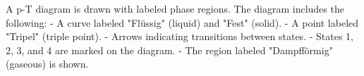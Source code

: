 A p-T diagram is drawn with labeled phase regions. The diagram includes the following:  
- A curve labeled "Flüssig" (liquid) and "Fest" (solid).  
- A point labeled "Tripel" (triple point).  
- Arrows indicating transitions between states.  
- States 1, 2, 3, and 4 are marked on the diagram.  
- The region labeled "Dampfförmig" (gaseous) is shown.